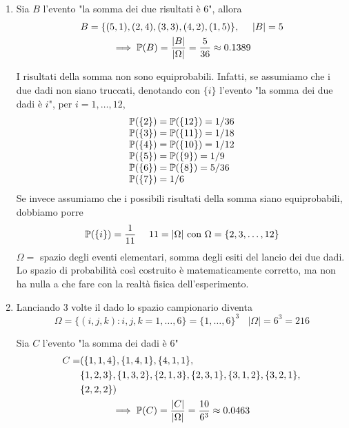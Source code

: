 \begin{enumerate}
	\item Sia $B$ l'evento "la somma dei due risultati è $6$", allora
	\begin{gather*}
		B=\{( 5,1) ,( 2,4) ,( 3,3) ,( 4,2) ,( 1,5)\} ,\ \ \ \ | B| =5\\
		\implies \mathbb{P}( B) =\frac{| B| }{| \Omega | } =\frac{5}{36} \approx 0.1389
	\end{gather*}

	\begin{oss}
		I risultati della somma non sono equiprobabili. Infatti, se assumiamo che i due dadi non siano truccati, denotando con $\{i\}$ l'evento "la somma dei due dadi è $i$", per $i=1,\dots ,12$,
		\begin{equation*}
			\begin{array}{ l }
				\mathbb{P}(\{2\}) =\mathbb{P}(\{12\}) =1/36\\
				\mathbb{P}(\{3\}) =\mathbb{P}(\{11\}) =1/18\\
				\mathbb{P}(\{4\}) =\mathbb{P}(\{10\}) =1/12\\
				\mathbb{P}(\{5\}) =\mathbb{P}(\{9\}) =1/9\\
				\mathbb{P}(\{6\}) =\mathbb{P}(\{8\}) =5/36\\
				\mathbb{P}(\{7\}) =1/6
			\end{array}
		\end{equation*}
		Se invece assumiamo che i possibili risultati della somma siano equiprobabili, dobbiamo porre
		\begin{equation*}
			\PP(\{i\}) =\frac{1}{11} \ \ \ \ 11=| \Omega | \ \text{con} \ \Omega =\{2,3,\dots ,12\}
		\end{equation*}
		$\Omega =$ spazio degli eventi elementari, somma degli esiti del lancio dei due dadi. Lo spazio di probabilità così costruito è matematicamente corretto, ma non ha nulla a che fare con la realtà fisica dell'esperimento.
	\end{oss}

	\item Lanciando $3$ volte il dado lo spazio campionario diventa
	\begin{equation*}
		\Omega =\{( i,j,k) :i,j,k=1,\dots ,6\} =\{1,\dots ,6\}^{3} \ \ \ \ | \Omega | =6^{3} =216
	\end{equation*}

	Sia $C$ l'evento "la somma dei dadi è $6$"
	\begin{gather*}
		\begin{aligned}
			C= & (\{1,1,4\} ,\{1,4,1\} ,\{4,1,1\} ,\\
			 & \{1,2,3\} ,\{1,3,2\} ,\{2,1,3\} ,\{2,3,1\} ,\{3,1,2\} ,\{3,2,1\} ,\\
			 & \{2,2,2\})
		\end{aligned}\\
		\implies \mathbb{P}( C) =\frac{| C| }{| \Omega | } =\frac{10}{6^{3}} \approx 0.0463
	\end{gather*}


\end{enumerate}
